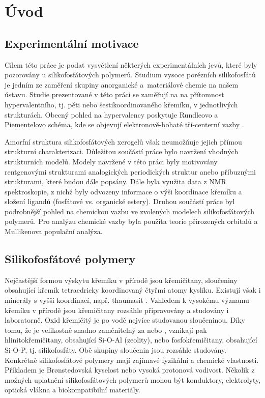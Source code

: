\documentclass[
digital, %
table,   %
lof,     %
lot,     %
oneside,
]{fithesis3}
\begin{document}
\chapter{Úvod}


\section{Experimentální motivace}
Cílem této práce je podat vysvětlení některých experimentálních jevů, které byly pozorovány u silikofosfátových polymerů. Studium vysoce porézních silikofosfátů je jedním ze zaměření skupiny anorganické a~materiálové chemie na našem ústavu. Studie prezentované v této práci se zaměřují na na přítomnost hypervalentního, tj. pěti nebo šestikoordinovaného křemíku, v jednotlivých strukturách. Obecný pohled na hypervalency poskytuje Rundleovo a Piementelovo schéma, kde se objevují elektronově-bohaté tří-centerní vazby \cite{405827} \cite{Munzarova2001}.

Amorfní struktura silikofosfátových xerogelů však neumožňuje jejich přímou strukturní charakterizaci. Důležitou součástí práce bylo navržení vhodných strukturních modelů. Modely navržené v této práci byly motivovány rentgenovými strukturami analogických periodických struktur \cite{C3NJ00721A} \cite{C4TA06823H} anebo příbuznými strukturami, které budou dále popsány. Dále byla využita data z NMR spektroskopie, z nichž byly odvozeny informace o výši koordinace křemíku a složení ligandů (fosfátové vs. organické estery)\cite{Styskalik2015thesis}. Druhou součástí práce byl podrobnější pohled na chemickou vazbu ve zvolených modelech silikofosfátových polymerů. Pro analýzu chemické vazby byla použita teorie přirozených orbitalů a Mullikenova populační analýza.

\section{Silikofosfátové polymery}
Nejčastější formou výskytu křemíku v přírodě jsou křemičitany, sloučeniny obsahující křemík tetraedricky koordinovaný čtyřmi atomy kyslíku. Existují však i minerály s vyšší koordinací, např. thaumasit \cite{Edge:a08100}. Vzhledem k vysokému významu křemíku v přírodě jsou křemičitany rozsáhle připravovány a studovány i laboratorně. Oxid křemičitý  je po vodě nejvíce studovanou sloučeninou. Díky tomu, že  je velikostně snadno zaměnitelný za  nebo , vznikají pak hlinitokřemičitany, obsahující Si-O-Al (zeolity), nebo fosfokřemičitany, obsahující Si-O-P, tj. silikofosfáty. Obě skupiny sloučenin jsou rozsáhle studovány. Konkrétně silikofosfátové polymery mají zajímavé fyzikální a chemické vlastnosti. Příkladem je Brønstedovská kyselost nebo vysoká protonová vodivost. Několik z možných uplatnění silikofosfátových polymerů mohou být konduktory, elektrolyty, optická vlákna a biokompatibilní materiály.\\
\end{document}
